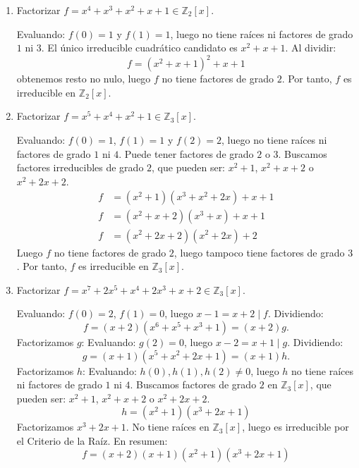 \begin{ejemplo}
    \leavevmode
    \begin{enumerate}[label=\arabic*)]
        \item Factorizar $f = x^4 + x^3 + x^2 + x + 1 \in \mathbb{Z}_2[x]$.
        
        Evaluando: $f(0) = 1$ y $f(1) = 1$, luego no tiene raíces ni factores de grado $1$ ni $3$. El único irreducible cuadrático candidato es $x^2 + x + 1$. Al dividir:
        \[
            f = (x^2 + x + 1)^2 + x +1
        \]
        obtenemos resto no nulo, luego $f$ no tiene factores de grado $2$. Por tanto, $f$ es irreducible en $\mathbb{Z}_2[x]$.


        \item Factorizar $f = x^5 + x^4 + x^2 + 1 \in \mathbb{Z}_3[x]$.
        
        Evaluando: $f(0) = 1$, $f(1) =1$ y $f(2) = 2$, luego no tiene raíces ni factores de grado $1$ ni $4$. Puede tener factores de grado $2$ o $3$. Buscamos factores irreducibles de grado $2$, que pueden ser: $x^2 + 1$, $x^2 + x + 2$ o $x^2 + 2x + 2$.
        \begin{align*}
            f &= (x^2 + 1)(x^3 + x^2 + 2x) + x + 1 \\
            f &= (x^2 + x + 2)(x^3 + x) + x + 1 \\
            f &= (x^2 + 2x + 2)(x^2 + 2x) + 2
        \end{align*}
        Luego $f$ no tiene factores de grado $2$, luego tampoco tiene factores de grado $3$. Por tanto, $f$ es irreducible en $\mathbb{Z}_3[x]$.

        \item Factorizar $f = x^7 + 2x^5 + x^4 + 2x^3 + x + 2 \in \mathbb{Z}_3[x]$.
        
        Evaluando: $f(0) = 2$, $f(1) = 0$, luego $x - 1 = x + 2 \mid f$. Dividiendo:
        \[
            f = (x + 2)(x^6 + x^5 + x^3 + 1) = (x + 2)g.
        \]
        Factorizamos $g$:
        Evaluando: $g(2) = 0$, luego $x - 2= x + 1 \mid g$. Dividiendo:
        \[
            g = (x + 1)(x^5 + x^2 + 2x + 1) = (x + 1)h.
        \]
        Factorizamos $h$:
        Evaluando: $h(0), h(1), h(2) \neq 0$, luego $h$ no tiene raíces ni factores de grado $1$ ni $4$. Buscamos factores de grado $2$ en $\mathbb{Z}_3[x]$, que pueden ser: $x^2 + 1$, $x^2 + x + 2$ o $x^2 + 2x + 2$.
        \[
            h = (x^2 + 1)(x^3 + 2x + 1)
        \]
        Factorizamos $x^3 + 2x + 1$. No tiene raíces en $\mathbb{Z}_3[x]$, luego es irreducible por el Criterio de la Raíz. En resumen:
        \[
            f = (x + 2)(x + 1)(x^2 + 1)(x^3 + 2x + 1)
        \]
    \end{enumerate}
\end{ejemplo}


